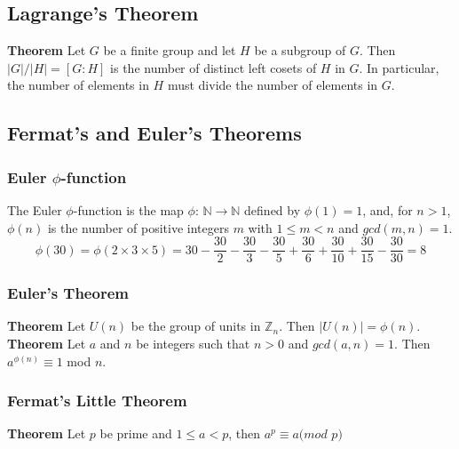 \documentclass{article}
\begin{document}
\subsection{Lagrange's Theorem}
\textbf{Theorem}
Let $G$ be a finite group and let $H$ be a subgroup of $G$. Then $|G|/|H|=[G:H]$ is the number of distinct left cosets of $H$ in $G$. In particular, the number of elements in $H$ must divide the number of elements in $G$.
\subsection{Fermat's and Euler's Theorems}
\subsubsection{Euler $\phi$-function}
The Euler $\phi$-function is the map $\phi$: $\mathbb{N}\rightarrow \mathbb{N}$ defined by $\phi(1)=1$, and, for $n>1$, $\phi(n)$ is the number of positive integers $m$ with $1\leq m<n$ and $gcd(m,n)=1$.
$$\phi(30)=\phi(2\times 3\times 5)=30-\frac{30}{2}-\frac{30}{3}-\frac{30}{5}+\frac{30}{6}+\frac{30}{10}+\frac{30}{15}-\frac{30}{30}=8$$
\subsubsection{Euler's Theorem}
\textbf{Theorem}
Let $U(n)$ be the group of units in $\mathbb{Z}_n$. Then $|U(n)|=\phi(n)$.\\
\textbf{Theorem}
Let $a$ and $n$ be integers such that $n>0$ and $gcd(a,n)=1$. Then $a^{\phi(n)}\equiv 1$ mod $n$.
\subsubsection{Fermat's Little Theorem}
\textbf{Theorem}
Let $p$ be prime and $1\leq a<p$, then $a^p \equiv a(mod $ $p)$
\end{document}
